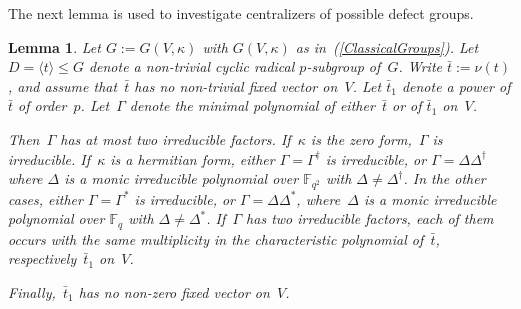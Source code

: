 \documentclass[12pt]{amsart}
\newtheorem{lem}[thm]{Lemma}
\theoremstyle{theorem}
\theoremstyle{definition}
\theoremstyle{remark}
\begin{document}
The next lemma is used to investigate centralizers of possible defect groups.
\begin{lem}
\label{ShapeOfMinimalPolynomial}
Let $G := G( V, \kappa )$ with $G( V, \kappa )$ as 
in~{\rm (\ref{ClassicalGroups})}. Let $D = \langle t \rangle \leq G$ denote a
non-trivial cyclic radical $p$-subgroup of~$G$. Write $\bar{t} := \nu( t )$, and 
assume that~$\bar{t}$ has no
non-trivial fixed vector on~$V$. Let $\bar{t}_1$ denote a power of $\bar{t}$ of 
order~$p$. Let~$\Gamma$ denote the minimal polynomial of either~$\bar{t}$ or
of $\bar{t}_1$ on~$V$. 

Then~$\Gamma$ has at most two irreducible factors. If~$\kappa$ is the zero 
form,~$\Gamma$ is irreducible. If~$\kappa$ is a hermitian form, either 
$\Gamma = \Gamma^\dagger$ is irreducible, or $\Gamma = \Delta\Delta^\dagger$ 
where $\Delta$ is a monic irreducible polynomial over $\mathbb{F}_{q^2}$ with 
$\Delta \neq \Delta^\dagger$. In the other cases, either $\Gamma = \Gamma^*$ is 
irreducible, or $\Gamma = \Delta\Delta^*$, where~$\Delta$ is a monic irreducible 
polynomial over $\mathbb{F}_{q}$ with $\Delta \neq \Delta^*$. If~$\Gamma$ has 
two irreducible factors, each of them occurs with the same multiplicity in the 
characteristic polynomial of~$\bar{t}$, respectively~$\bar{t}_1$ on~$V$.

Finally,~$\bar{t}_1$ has no non-zero fixed vector on~$V$.
\end{lem}
\end{document}
